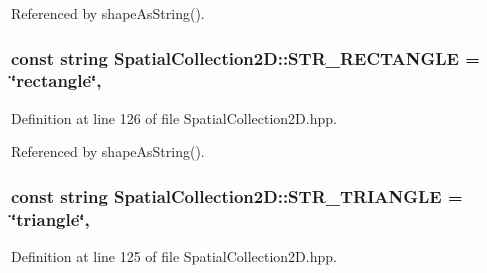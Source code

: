 Referenced by shape\-As\-String().

\hypertarget{classmultiscale_1_1analysis_1_1SpatialCollection2D_ad98d817f86185eb9c7f0d061b9c40cce}{
\subsubsection[{S\-T\-R\-\_\-\-R\-E\-C\-T\-A\-N\-G\-L\-E}]{\setlength{\rightskip}{0pt plus 5cm}const string Spatial\-Collection2\-D\-::\-S\-T\-R\-\_\-\-R\-E\-C\-T\-A\-N\-G\-L\-E = \char`\"{}rectangle\char`\"{}\hspace{0.3cm}{\ttfamily [static]}, {\ttfamily [protected]}}}\label{classmultiscale_1_1analysis_1_1SpatialCollection2D_ad98d817f86185eb9c7f0d061b9c40cce}


Definition at line 126 of file Spatial\-Collection2\-D.\-hpp.



Referenced by shape\-As\-String().

\hypertarget{classmultiscale_1_1analysis_1_1SpatialCollection2D_ae666d6dc811ea20b7ce3cf2a66476fc1}{
\subsubsection[{S\-T\-R\-\_\-\-T\-R\-I\-A\-N\-G\-L\-E}]{\setlength{\rightskip}{0pt plus 5cm}const string Spatial\-Collection2\-D\-::\-S\-T\-R\-\_\-\-T\-R\-I\-A\-N\-G\-L\-E = \char`\"{}triangle\char`\"{}\hspace{0.3cm}{\ttfamily [static]}, {\ttfamily [protected]}}}\label{classmultiscale_1_1analysis_1_1SpatialCollection2D_ae666d6dc811ea20b7ce3cf2a66476fc1}


Definition at line 125 of file Spatial\-Collection2\-D.\-hpp.



